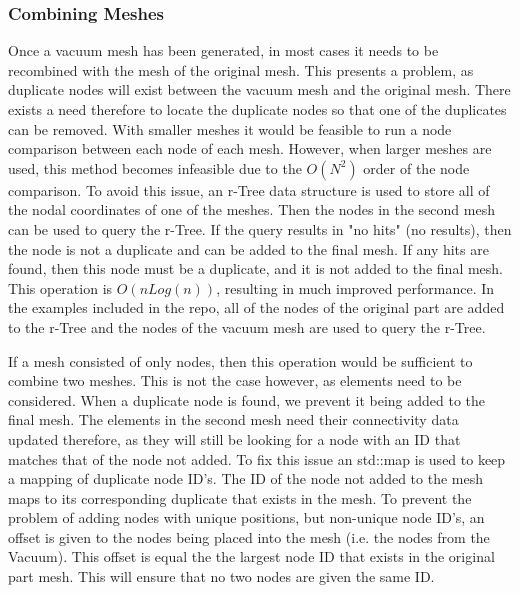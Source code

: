 \documentclass[12pt, letterpaper]{article}
\begin{document}
\subsubsection{Combining Meshes} \label{rTree}
Once a vacuum mesh has been generated, in most cases it needs to be recombined with the mesh of the original mesh. This presents a problem, as duplicate nodes will exist between the vacuum mesh and the original mesh. There exists a need therefore to locate the duplicate nodes so that one of the duplicates can be removed. With smaller meshes it would be feasible to run a node comparison between each node of each mesh. However, when larger meshes are used, this method becomes infeasible due to the $O(N^2)$ order of the node comparison. To avoid this issue, an r-Tree data structure is used to store all of the nodal coordinates of one of the meshes. Then the nodes in the second mesh can be used to query the r-Tree. If the query results in "no hits" (no results), then the node is not a duplicate and can be added to the final mesh. If any hits are found, then this node must be a duplicate, and it is not added to the final mesh. This operation is $O(nLog(n))$, resulting in much improved performance. In the examples included in the repo, all of the nodes of the original part are added to the r-Tree and the nodes of the vacuum mesh are used to query the r-Tree.

If a mesh consisted of only nodes, then this operation would be sufficient to combine two meshes. This is not the case however, as elements need to be considered. When a duplicate node is found, we prevent it being added to the final mesh. The elements in the second mesh need their connectivity data updated therefore, as they will still be looking for a node with an ID that matches that of the node not added. To fix this issue an std::map is used to keep a mapping of duplicate node ID's. The ID of the node not added to the mesh maps to its corresponding duplicate that exists in the mesh. To prevent the problem of adding nodes with unique positions, but non-unique node ID's, an offset is given to the nodes being placed into the mesh (i.e. the nodes from the Vacuum). This offset is equal the the largest node ID that exists in the original part mesh. This will ensure that no two nodes are given the same ID.
\end{document}
